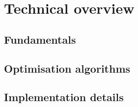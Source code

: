 \section{Technical overview}
\label{sec:poise__technical}




\subsection{Fundamentals}
\label{subsec:poise__fundamentals}



\subsection{Optimisation algorithms}
\label{subsec:poise__algorithms}



\subsection{Implementation details}
\label{subsec:poise__implementation}



